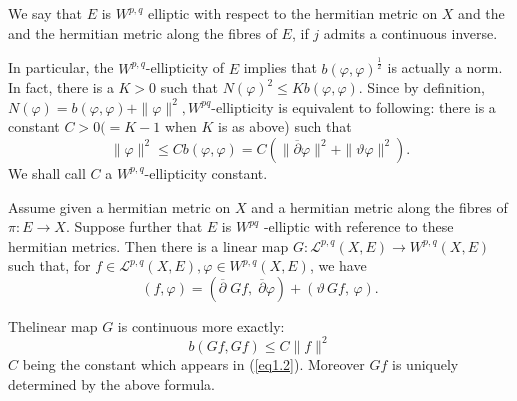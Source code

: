 \begin{definition}%
  We say that $E$ is ${W}^{p,q}$ elliptic with respect to the
  hermitian metric on $X$ and the and the hermitian metric along the
  fibres of $E$, if $j$ admits a continuous inverse. 

  In particular, the $W^{p,q}$-ellipticity of $E$ implies that
  $b(\varphi, \varphi)^{\frac{1}{2}}$ is actually a norm. In fact, there
  is a $K>0$ such that $N(\varphi)^{2} \leqslant K b(\varphi,
  \varphi)$. Since by definition, $N(\varphi) = b(\varphi,
  \varphi) + \| \varphi\|^{2}, W^{pq}$-ellipticity is
  equivalent to following: there is a constant $C > 0( = K-1$
  when $K$ is as above) such that 
  \begin {equation*} 
    \| \varphi\|^{2} \leqslant C b (\varphi, \varphi) = C(\|
    \overline{\partial} \varphi \|^{2} + \| \vartheta \varphi
    \|^{2}).  \tag{1.2}\label{eq1.2}
  \end{equation*}
  We shall call $C$ a $W^{p,q}$-ellipticity constant.
\end{definition}

\begin{prop}\label{chap1:prop1.2}%
  Assume given a hermitian metric on $X$ and a hermitian metric along
  the fibres of $\pi: E \rightarrow {X}$. Suppose further
  that $E$ is $W^{pq}$ -elliptic with reference to these
  hermitian metrics.  
  Then there is a linear map $G : \mathcal{L}^{p,q} (X,E)
  \rightarrow W^{p,q} (X, E)$ such that, for 
  $f \in \mathcal{L}^{p,q} (X,E), \varphi \in
  W^{p,q} (X,E)$, we have 
  $$
  (f, \varphi) = (\overline{\partial} \;Gf, \;\overline{\partial}
  \varphi) + (\vartheta \,Gf, \,\varphi).
  $$ 
\end{prop}

The\pageoriginale linear map $G$ is continuous more exactly:
\begin{equation*}
  {b (Gf, Gf)} \leqslant C \|f\|^{2} \tag{1.3}\label{eq1.3}
\end{equation*}
$C$ being the constant which appears in (\ref{eq1.2}). 
Moreover $Gf$ is uniquely determined by the above formula.

